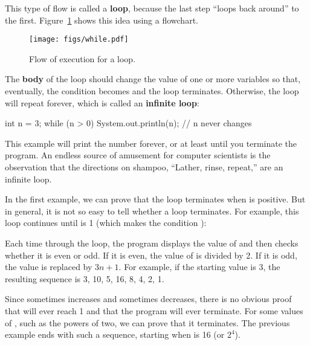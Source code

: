 
This type of flow is called a {\bf loop}, because the last step ``loops back around'' to the first.
Figure~\ref{fig.while} shows this idea using a flowchart.

\begin{figure}[!ht]
\begin{center}
\texttt{[image: figs/while.pdf]}
\caption{Flow of execution for a  loop.}
\label{fig.while}
\end{center}
\end{figure}


The {\bf body} of the loop should change the value of one or more variables so that, eventually, the condition becomes  and the loop terminates.
Otherwise, the loop will repeat forever, which is called an {\bf infinite loop}:

\begin{code}
int n = 3;
while (n > 0) {
    System.out.println(n);
    // n never changes
}
\end{code}

This example will print the number  forever, or at least until you terminate the program.
An endless source of amusement for computer scientists is the observation that the directions on shampoo, ``Lather, rinse, repeat,'' are an infinite loop.

In the first example, we can prove that the loop terminates when  is positive.
But in general, it is not so easy to tell whether a loop terminates.
For example, this loop continues until  is 1 (which makes the condition ):


Each time through the loop, the program displays the value of  and then checks whether it is even or odd.
If it is even, the value of  is divided by 2.
If it is odd, the value is replaced by $3n+1$.
For example, if the starting value is 3, the resulting sequence is 3, 10, 5, 16, 8, 4, 2, 1.

Since  sometimes increases and sometimes decreases, there is no obvious proof that  will ever reach 1 and that the program will ever terminate.
For some values of , such as the powers of two, we can prove that it terminates.
The previous example ends with such a sequence, starting when  is 16 (or $2^4$).

